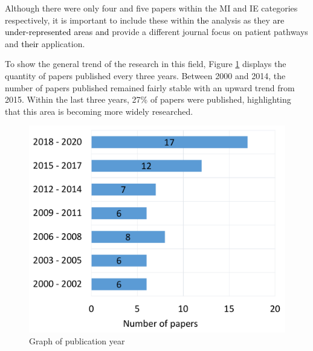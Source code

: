 \documentclass[../thesis.tex]{subfiles}
\begin{document}
Although there were only four and five papers within the MI and IE categories respectively, it is important to include these within \textcolor{black}{the} analysis as they \textcolor{black}{are under-represented areas and}
provide a different journal focus on patient pathways and \textcolor{black}{their} application.

To show the general trend of the research in this field, Figure \ref{fig:yearofpaper} displays the quantity of papers published every three years. Between 2000 and 2014, the number of papers published remained fairly stable with an upward trend from 2015. Within the last three years, 27\% of papers were published, highlighting that this area is becoming more widely researched. 

\begin{figure}[H]
\centering
  \includegraphics[scale=0.35]{Chapter2/Figures/Years2.pdf}
  \caption{Graph of publication year}
\label{fig:yearofpaper}    
\end{figure}
\end{document}
